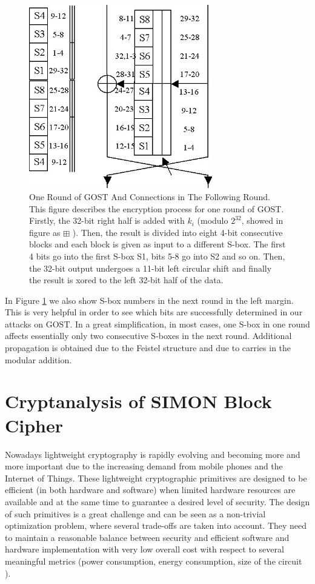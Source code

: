 \begin{figure}[h] 
	\centering
	\includegraphics[width=80mm]{./pics/gostfeist2.jpg}
	
	\caption[One Round of GOST And Connections in The Following Round] {One Round of GOST And Connections in The Following Round. This figure describes the encryption process for one round of GOST. Firstly, the 32-bit right half is added with $k_{i}$ (modulo $2^{32}$, showed in figure as  $\boxplus$ ). Then, the result is divided into eight 4-bit consecutive blocks and each block is given as input to a different S-box. The first 4 bits go into the first S-box S1, bits 5-8 go into S2 and so on. Then, the 32-bit output undergoes a 11-bit left circular shift and finally the result is xored to the left 32-bit half of the data.}
	\label{GostRoundAndConnections}
\end{figure}

In Figure \ref{GostRoundAndConnections}
we also show S-box numbers
in the next round in the left margin.
This is very helpful in order to see which bits are successfully determined in our attacks on GOST.
In a great simplification, in most cases, one S-box in one round affects essentially
only two consecutive S-boxes in the next round. Additional propagation is obtained due to the Feistel structure
and due to carries in the modular addition.

\section{Cryptanalysis of SIMON Block Cipher}
Nowadays lightweight cryptography is rapidly evolving and becoming more and more important due to the increasing demand from mobile phones and the Internet of Things. These lightweight cryptographic primitives are designed to
be efficient (in both hardware and software) when limited
hardware resources are available and at the same time to
guarantee a desired level of security. The
design of such primitives is a great challenge and can be
seen as a non-trivial optimization problem, where several
trade-offs are taken into account. They need to maintain
a reasonable balance between security and efficient software and hardware
implementation with very low overall cost with respect to several
meaningful metrics (power consumption, energy consumption, size of the circuit \cite{OptimiPaper,BoyarPeraltaMCMethod,BoyarPeraltaMCBoolean}).

